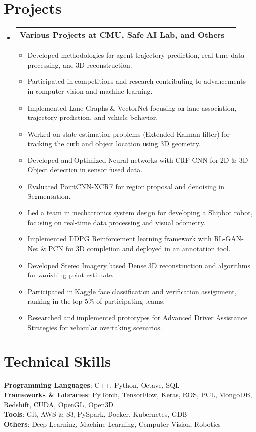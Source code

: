 \documentclass[letterpaper,11pt]{article}
\makeatletter
\newcommand{\resumeItem}[1]{
  \item\small{
    {#1 }
  }
}
\newcommand{\resumeProjectHeading}[2]{
    \item
    \begin{tabular*}{0.97\textwidth}{l@{\extracolsep{\fill}}r}
      \small#1 & #2 \\
    \end{tabular*}\vspace{0pt}
}
\newcommand{\resumeSubHeadingListStart}{\begin{itemize}[leftmargin=0.15in, label={}]}
\newcommand{\resumeSubHeadingListEnd}{\end{itemize}}
\newcommand{\resumeItemListStart}{\begin{itemize}\vspace{-5pt}}
\newcommand{\resumeItemListEnd}{\end{itemize}\vspace{-5pt}}
\makeatother
\begin{document}
\section{Projects}
  \resumeSubHeadingListStart
    \resumeProjectHeading
      {\textbf{Various Projects at CMU, Safe AI Lab, and Others}}{}
      \resumeItemListStart
        \resumeItem{Developed methodologies for agent trajectory prediction, real-time data processing, and 3D reconstruction.}
        \resumeItem{Participated in competitions and research contributing to advancements in computer vision and machine learning.}
        \resumeItem{Implemented Lane Graphs \& VectorNet focusing on lane association, trajectory prediction, and vehicle behavior.}
        \resumeItem{Worked on state estimation problems (Extended Kalman filter) for tracking the curb and object location using 3D geometry.}
        \resumeItem{Developed and Optimized Neural networks with CRF-CNN for 2D \& 3D Object detection in sensor fused data.}
        \resumeItem{Evaluated PointCNN-XCRF for region proposal and denoising in Segmentation.}
        \resumeItem{Led a team in mechatronics system design for developing a Shipbot robot, focusing on real-time data processing and visual odometry.}
        \resumeItem{Implemented DDPG Reinforcement learning framework with RL-GAN-Net \& PCN for 3D completion and deployed in an annotation tool.}
        \resumeItem{Developed Stereo Imagery based Dense 3D reconstruction and algorithms for vanishing point estimate.}
        \resumeItem{Participated in Kaggle face classification and verification assignment, ranking in the top 5\% of participating teams.}
        \resumeItem{Researched and implemented prototypes for Advanced Driver Assistance Strategies for vehicular overtaking scenarios.}
      \resumeItemListEnd
  \resumeSubHeadingListEnd



\section{Technical Skills}
 \begin{itemize}[leftmargin=0.15in, label={}]
    \small{\item{
     \textbf{Programming Languages}{: C++, Python, Octave, SQL} \\
     \textbf{Frameworks \& Libraries}{: PyTorch, TensorFlow, Keras, ROS, PCL, MongoDB, Redshift, CUDA, OpenGL, Open3D} \\
     \textbf{Tools}{: Git, AWS \& S3, PySpark, Docker, Kubernetes, GDB} \\
     \textbf{Others}{: Deep Learning, Machine Learning, Computer Vision, Robotics}
    }}
 \end{itemize}
\end{document}
